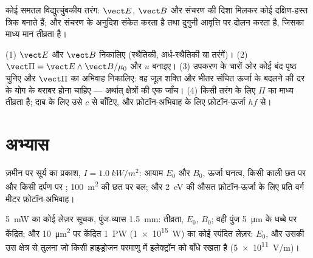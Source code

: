 \begin{omfigure}

{\small कोई समतल विद्युत्चुंबकीय तरंग: $\vect E$, $\vect B$ और
संचरण की दिशा मिलकर कोई दक्षिण-हस्त त्रिक बनाते हैं; और  संचरण के अनुदिश संकेत करता है तथा दुगुनी आवृत्ति पर दोलन करता है,
जिसका माध्य मान तीव्रता है।}
\end{omfigure}

\begin{method}[ऊर्जा का बहीखाता]\label{met:b2:poynting-vector:method}
(1) $\vect E$ और $\vect B$ निकालिए (स्थैतिकी, अर्ध-स्थैतिकी या तरंगें)। (2)
$\vect\Pi = \vect E\wedge\vect B/\mu_0$ और $u$ बनाइए। (3) उपकरण के चारों ओर कोई
बंद पृष्ठ चुनिए और $\vect\Pi$ का अभिवाह निकालिए: वह जूल शक्ति और भीतर संचित
ऊर्जा के बदलने की दर के योग के बराबर होना चाहिए
--- अर्थात् क्षेत्रों की एक जाँच। (4) किसी तरंग के लिए $\Pi$ का माध्य
तीव्रता है; दाब के लिए उसे $c$ से बाँटिए, और फ़ोटॉन-अभिवाह के लिए
फ़ोटॉन-ऊर्जा $hf$ से।
\end{method}

\section{अभ्यास}

\begin{exercise}[$\star$]\label{exo:b2:poynting-vector:1}
ज़मीन पर सूर्य का प्रकाश, $I = \qty{1.0}{kW/m^2}$: आयाम $E_0$ और $B_0$,
ऊर्जा घनत्व, किसी काली छत पर और किसी दर्पण पर ;
\qty{100}{m^2} की छत पर बल; और \qty{2}{eV} की औसत फ़ोटॉन-ऊर्जा के लिए प्रति
वर्ग मीटर फ़ोटॉन-अभिवाह।
\end{exercise}

\begin{exercise}[$\star$]\label{exo:b2:poynting-vector:2}
\qty{5}{mW} का कोई लेज़र सूचक, पुंज-व्यास \qty{1.5}{mm}: तीव्रता, $E_0$,
$B_0$; वही पुंज \qty{5}{\micro m} के धब्बे पर केंद्रित; और \qty{10}{\micro m^2} पर केंद्रित
\qty{1}{PW} (\qty{1e15}{W}) का कोई स्पंदित लेज़र: $E_0$, और उसकी उस क्षेत्र से तुलना
जो किसी हाइड्रोजन परमाणु में इलेक्ट्रॉन को बाँधे रखता है (\qty{5e11}{V/m})।
\end{exercise}

